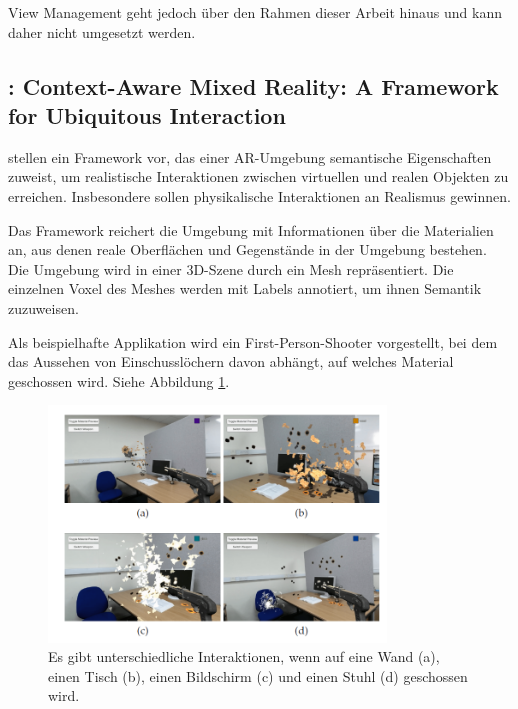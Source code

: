 View Management geht jedoch über den Rahmen dieser Arbeit hinaus und kann daher nicht umgesetzt werden. %



\subsection{\cite{contextawaremixedreality}: Context-Aware Mixed Reality: A Framework for Ubiquitous Interaction}

\cite{contextawaremixedreality} stellen ein Framework vor, das einer AR-Umgebung semantische Eigenschaften zuweist, um realistische Interaktionen zwischen virtuellen und realen Objekten zu erreichen. 
Insbesondere sollen physikalische Interaktionen an Realismus gewinnen.

Das Framework reichert die Umgebung mit Informationen über die Materialien an, aus denen reale Oberflächen und Gegenstände in der Umgebung bestehen. Die Umgebung wird in einer 3D-Szene durch ein Mesh repräsentiert. Die einzelnen Voxel des Meshes werden mit Labels annotiert, um ihnen Semantik zuzuweisen.

Als beispielhafte Applikation wird ein First-Person-Shooter vorgestellt, bei dem das Aussehen von Einschusslöchern davon abhängt, auf welches Material geschossen wird. Siehe Abbildung \ref{img:game}.

\begin{figure}[h]
	\centering
	\includegraphics[width=0.8\textwidth]{images/img_shootinggame.png}
	\caption[Context Aware Shooter von \cite{contextawaremixedreality}]{Es gibt unterschiedliche Interaktionen, wenn auf eine Wand (a), einen Tisch (b), einen Bildschirm (c) und einen Stuhl (d) geschossen wird.\citep{contextawaremixedreality}}
	\label{img:game}
\end{figure}

